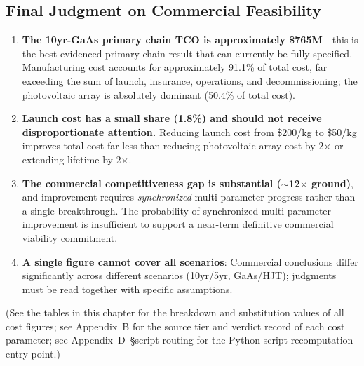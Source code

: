 \subsection{Final Judgment on Commercial Feasibility}

\begin{enumerate}[leftmargin=*]
    \item \textbf{The 10yr-GaAs primary chain TCO is approximately \$765M}---this is the best-evidenced primary chain result that can currently be fully specified. Manufacturing cost accounts for approximately 91.1\% of total cost, far exceeding the sum of launch, insurance, operations, and decommissioning; the photovoltaic array is absolutely dominant (50.4\% of total cost).
    \item \textbf{Launch cost has a small share (1.8\%) and should not receive disproportionate attention.} Reducing launch cost from \$200/kg to \$50/kg improves total cost far less than reducing photovoltaic array cost by 2$\times$ or extending lifetime by 2$\times$.
    \item \textbf{The commercial competitiveness gap is substantial ($\sim$12$\times$ ground)}, and improvement requires \emph{synchronized} multi-parameter progress rather than a single breakthrough. The probability of synchronized multi-parameter improvement is insufficient to support a near-term definitive commercial viability commitment.
    \item \textbf{A single figure cannot cover all scenarios}: Commercial conclusions differ significantly across different scenarios (10yr/5yr, GaAs/HJT); judgments must be read together with specific assumptions.
\end{enumerate}

(See the tables in this chapter for the breakdown and substitution values of all cost figures; see Appendix~B for the source tier and verdict record of each cost parameter; see Appendix~D~\S script routing for the Python script recomputation entry point.)

\endinput
